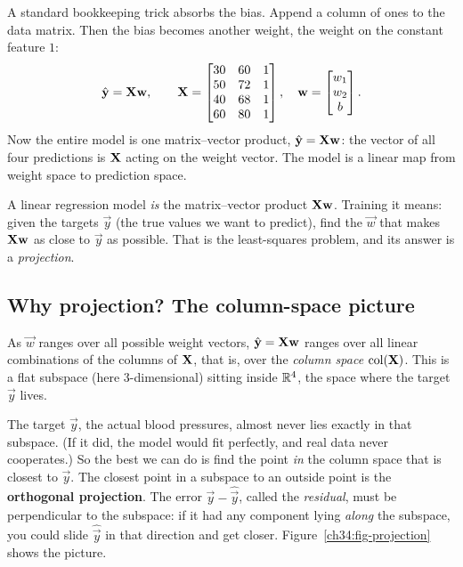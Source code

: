 A standard bookkeeping trick absorbs the bias. Append a column of ones to the
data matrix. Then the bias becomes another weight, the weight on the constant
feature $1$:
\[
\hat{\mathbf{y}} = \mathbf{X}\mathbf{w}, \qquad
\mathbf{X} =
\begin{bmatrix}
30 & 60 & 1 \\
50 & 72 & 1 \\
40 & 68 & 1 \\
60 & 80 & 1
\end{bmatrix},
\quad
\mathbf{w} = \begin{bmatrix} w_1 \\ w_2 \\ b \end{bmatrix}.
\]
Now the entire model is one matrix--vector product, $\hat{\mathbf{y}} = \mathbf{X}\mathbf{w}$:
the vector of all four predictions is $\mathbf{X}$ acting on the weight vector. The model
is a linear map from weight space to prediction space.

\begin{focusbox}
A linear regression model \emph{is} the matrix--vector product $\mathbf{X}\mathbf{w}$. Training
it means: given the targets $\vec{y}$ (the true values we want to predict), find the
$\vec{w}$ that makes $\mathbf{X}\mathbf{w}$ as close to $\vec{y}$ as possible. That is the
least-squares problem, and its answer is a \emph{projection}.
\end{focusbox}

\subsection{Why projection? The column-space picture}

As $\vec{w}$ ranges over
all possible weight vectors, $\hat{\mathbf{y}} = \mathbf{X}\mathbf{w}$ ranges over all linear
combinations of the columns of $\mathbf{X}$, that is, over the \emph{column space}
$\operatorname{col}(\mathbf{X})$. This is a flat subspace (here 3-dimensional) sitting
inside $\mathbb{R}^{4}$, the space where the target $\vec{y}$ lives.

The target $\vec{y}$, the actual blood pressures, almost never lies exactly in that
subspace. (If it did, the model would fit perfectly, and real data never cooperates.)
So the best we can do is find the point \emph{in} the column space that is closest to
$\vec{y}$. The closest point in a subspace to an outside point is the \textbf{orthogonal
projection}. The error $\vec{y} - \hat{\vec{y}}$, called the \emph{residual}, must be
perpendicular to the subspace: if it had any component lying \emph{along} the subspace,
you could slide $\hat{\vec{y}}$ in that direction and get closer.
Figure~\ref{ch34:fig-projection} shows the picture.

